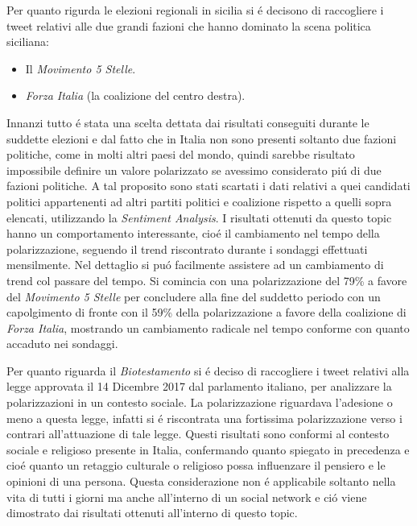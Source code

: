 Per quanto rigurda le elezioni regionali in sicilia si \'e decisono di raccogliere i tweet relativi alle due grandi fazioni che hanno dominato la scena politica siciliana:
\begin{itemize}
\item  Il \textit{Movimento 5 Stelle}. 
\item \textit{Forza Italia} (la coalizione del centro destra).
\end{itemize}
Innanzi tutto \'e stata una scelta dettata dai risultati conseguiti durante le suddette elezioni e dal fatto che in Italia non sono presenti soltanto due fazioni politiche, come in molti altri paesi del mondo, quindi sarebbe risultato impossibile definire un valore polarizzato se avessimo considerato pi\'u di due fazioni politiche.
A tal proposito sono stati scartati i dati relativi a quei candidati politici appartenenti ad altri partiti politici e coalizione rispetto a quelli sopra elencati, utilizzando la \textit{Sentiment Analysis}.
I risultati ottenuti da questo topic hanno un comportamento interessante, cio\'e il cambiamento nel tempo della polarizzazione, seguendo il trend riscontrato durante i sondaggi effettuati mensilmente. Nel dettaglio si pu\'o facilmente assistere ad un cambiamento di trend col passare del tempo.
Si comincia con una polarizzazione del 79\% a favore del \textit{Movimento 5 Stelle} per concludere alla fine del suddetto periodo con un capolgimento di fronte con il 59\% della polarizzazione a favore della coalizione di \textit{Forza Italia}, mostrando un cambiamento radicale nel tempo conforme con quanto accaduto nei sondaggi.

Per quanto riguarda il \textit{Biotestamento} si \'e deciso di raccogliere i tweet relativi alla legge approvata il 14 Dicembre 2017 dal parlamento italiano, per analizzare la polarizzazioni in un contesto sociale.
La polarizzazione riguardava l'adesione o meno a questa legge, infatti si \'e riscontrata una fortissima polarizzazione verso i contrari all'attuazione di tale legge. %
Questi risultati sono conformi al contesto sociale e religioso presente in Italia, confermando quanto spiegato in precedenza e cio\'e quanto un retaggio culturale o religioso possa influenzare il pensiero e le opinioni di una persona. Questa considerazione non \'e applicabile soltanto nella vita di tutti i giorni ma anche all'interno di un social network e ci\'o viene dimostrato dai risultati ottenuti all'interno di questo topic.

